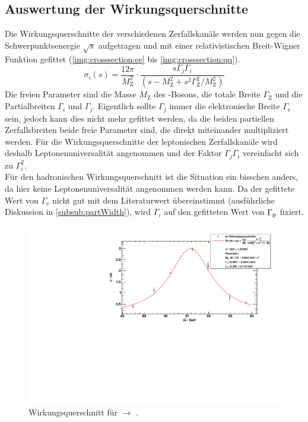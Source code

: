 \subsection{Auswertung der Wirkungsquerschnitte}
Die Wirkungsquerschnitte der verschiedenen Zerfallskanäle werden nun gegen die Schwerpunktsenergie $\sqrt{s}$ aufgetragen und mit einer 
relativistischen Breit-Wigner Funktion \cite{manual} gefittet (\autoref{img:crosssection:ee} bis \autoref{img:crosssection:qq}).
\begin{equation}
    \sigma_i(s) = \frac{12 \pi}{M_\text{Z}^2} \cdot \frac{s \Gamma_j \Gamma_i}{ \left( s - M_\text{Z}^2 + s^2 \Gamma_\text{Z}^2 / M_\text{Z}^2 \right) }
\end{equation}
Die freien Parameter sind die Masse $M_\text{Z}$ des \Z-Bosons, die totale Breite $\Gamma_\text{Z}$ und 
die Partialbreiten $\Gamma_i$ und $\Gamma_j$. Eigentlich sollte $\Gamma_j$ immer die elektronische Breite $\Gamma_\text{e}$ sein, jedoch 
kann dies nicht mehr gefittet werden, da die beiden partiellen Zerfallsbreiten beide freie Parameter sind, die direkt miteinander multipliziert 
werden. Für die Wirkungsquerschnitte der leptonischen Zerfallskanäle wird deshalb Leptonenuniversalität angenommen und der Faktor $\Gamma_j \Gamma_i$ 
vereinfacht sich zu $\Gamma_i^2$. \\
Für den hadronischen Wirkungsquerschnitt ist die Situation ein bisschen anders, da hier keine Leptonenuniversalität angenommen werden kann. 
Da der gefittete Wert von $\Gamma_\text{e}$ nicht gut mit dem Literaturwert übereinstimmt (ausführliche Diskussion in \autoref{subsub:partWidth}), 
wird $\Gamma_i$ auf den gefitteten Wert von $\Gamma_\text{\textmu}$ fixiert.

\begin{figure}[H]
    \begin{center}
        \includegraphics[width=\textwidth]{../img/crosssections_ee.pdf}
        \caption{Wirkungsquerschnitt für \ee $\to$ \ee.}
        \label{img:crosssection:ee}
    \end{center}
\end{figure}

